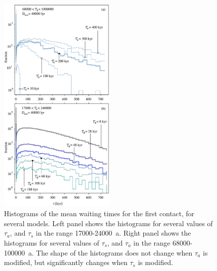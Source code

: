 \documentclass[crop]{CSLB}
\begin{document}
\begin{figure}
   \centering
   \includegraphics[width=0.5\textwidth]{F_waiting_for_1C.pdf}
   \caption{
Histograms of the mean waiting times for the first contact, for
several models.
%
Left panel shows the histograms for several values of $\tau_a$, and
$\tau_s$ in the range 17000-24000~a.
%
Right panel shows the histograms for several values of $\tau_s$, and
$\tau_a$ in the range 68000-100000~a.
%
The shape of the histograms does not change when $\tau_a$ is
modified, but significantly changes when $\tau_s$ is modified. 
%
   }
   \label{F_waiting_for_1C}
\end{figure}
\end{document}
